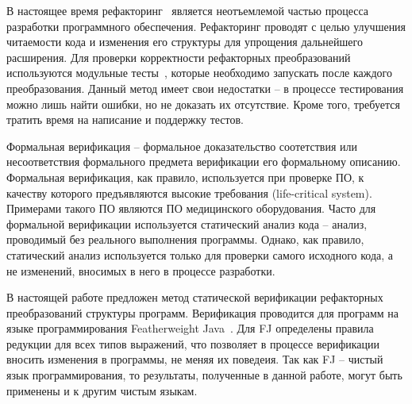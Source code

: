 \startprefacepage

В настоящее время рефакторинг~\cite{refactoring} является неотъемлемой частью процесса разработки программного обеспечения.
Рефакторинг проводят с целью улучшения читаемости кода и изменения его структуры для упрощения дальнейшего расширения.
Для проверки корректности рефакторных преобразований используются модульные тесты~\cite{tdd},
которые необходимо запускать после каждого преобразования.
Данный метод имеет свои недостатки -- в процессе тестирования можно лишь найти ошибки, но не доказать их отсутствие. 
Кроме того, требуется тратить время на написание и поддержку тестов.

Формальная верификация -- формальное доказательство соотетствия или несоответствия формального предмета верификации его формальному описанию.
Формальная верификация, как правило, используется при проверке ПО, к качеству которого предъявляются высокие требования (life-critical system).
Примерами такого ПО являются ПО медицинского оборудования.
Часто для формальной верификации используется статический анализ кода -- анализ, проводимый без реального выполнения программы.
Однако, как правило, статический анализ используется только для проверки самого исходного кода, а не изменений, вносимых в него в процессе разработки.

В настоящей работе предложен метод статической верификации рефакторных преобразований структуры программ.
Верификация проводится для программ на языке программирования Featherweight Java~\cite{fj}.
Для FJ определены правила редукции для всех типов выражений, что позволяет в процессе верификации вносить изменения в программы, не меняя их поведеия.
Так как FJ -- чистый язык программирования, то результаты, полученные в данной работе,
могут быть применены и к другим чистым языкам.